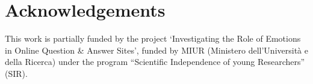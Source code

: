 \section*{Acknowledgements}
This work is partially funded by the project \enquote*{Investigating the Role of Emotions in Online Question \& Answer Sites}, funded by MIUR (Ministero dell{'}Universit{\`{a}} e della Ricerca) under the program \enquote{Scientific Independence of young Researchers} (SIR).